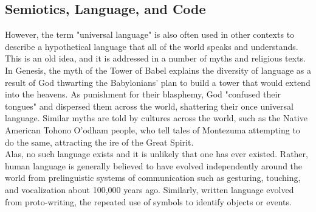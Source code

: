



\subsection{Semiotics, Language, and Code}



However, the term "universal language" is also often used in other contexts to describe a hypothetical language that all of the world speaks and understands. This is an old idea, and it is addressed in a number of myths and religious texts. In Genesis, the myth of the Tower of Babel explains the diversity of language as a result of God thwarting the Babylonians' plan to build a tower that would extend into the heavens. As punishment for their blasphemy, God "confused their tongues" and dispersed them across the world, shattering their once universal language. Similar myths are told by cultures across the world, such as the Native American Tohono O'odham people, who tell tales of Montezuma attempting to do the same, attracting the ire of the Great Spirit. \\

Alas, no such language exists and it is unlikely that one has ever existed. Rather, human language is generally believed to have evolved independently around the world from prelinguistic systems of communication such as gesturing, touching, and vocalization about 100,000 years ago. Similarly, written language evolved from proto-writing, the repeated use of symbols to identify objects or events. \\

